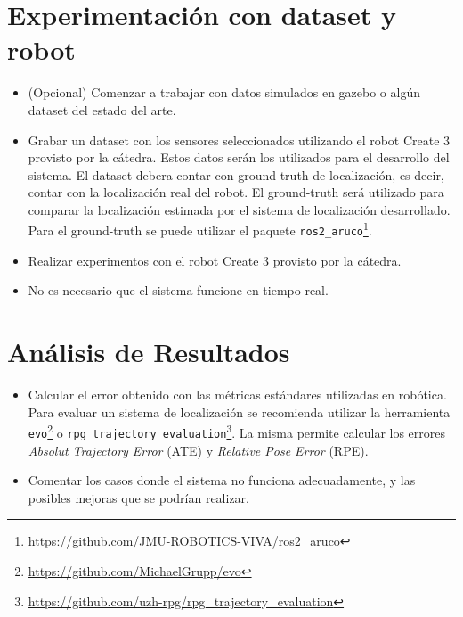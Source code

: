 \documentclass[tp]{lcc}
\begin{document}
	
	\section{Experimentación con dataset y robot}
	\begin{itemize}
        
        \item (Opcional) Comenzar a trabajar con datos simulados en gazebo o algún dataset del estado del arte.
        
		\item Grabar un dataset con los sensores seleccionados utilizando el robot Create 3 provisto por la cátedra. Estos datos serán los utilizados para el desarrollo del sistema. El dataset debera contar con ground-truth de localización, es decir, contar con la localización real del robot. El ground-truth será utilizado para comparar la localización estimada por el sistema de localización desarrollado. Para el ground-truth se puede utilizar el paquete \lstinline{ros2_aruco}\footnote{\url{https://github.com/JMU-ROBOTICS-VIVA/ros2_aruco}}. 
		
		\item Realizar experimentos con el robot Create 3 provisto por la cátedra.
		
		\item No es necesario que el sistema funcione en tiempo real.
	\end{itemize}
	
	
	\section{Análisis de Resultados}
		\begin{itemize}
			\item Calcular el error obtenido con las métricas estándares utilizadas en robótica. Para evaluar un sistema de localización se recomienda utilizar la herramienta \lstinline{evo}\footnote{\url{https://github.com/MichaelGrupp/evo}} o \lstinline{rpg_trajectory_evaluation}\footnote{\url{https://github.com/uzh-rpg/rpg_trajectory_evaluation}}. La misma permite calcular los errores \emph{Absolut Trajectory Error} (ATE) y \emph{Relative Pose Error} (RPE).
		
			\item Comentar los casos donde el sistema no funciona adecuadamente, y las posibles mejoras que se podrían realizar.
		\end{itemize}

	\printbibliography
	
\end{document}
